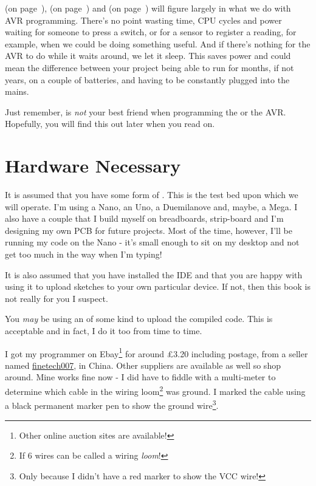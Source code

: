  (on page~\pageref{avr-interrupts}),  (on page~\pageref{avr-timers}) and  (on page~\pageref{avr-sleep-modes}) will figure largely in what we do with AVR programming. There's no point wasting time, CPU cycles and power waiting for someone to press a switch, or for a sensor to register a reading, for example, when we could be doing something useful. And if there's nothing for the AVR to do while it waits around, we let it sleep. This saves power and could mean the difference between your project being able to run for months, if not years, on a couple of batteries, and having to be constantly plugged into the mains.

Just remember,  is \emph{not} your best friend when programming the   or the AVR. Hopefully, you will find this out later when you read on.

\section*{Hardware Necessary}\label{hardware-necessary}

It is assumed that you have some form of . This is the test bed upon which we will operate. I'm using a Nano, an Uno, a Duemilanove and, maybe, a Mega. I also have a couple that I build myself on breadboards, strip-board and I'm designing my own PCB for future projects. Most of the time, however, I'll be running my code on the Nano - it's small enough to sit on my desktop and not get too much in the way when I'm typing!

It is also assumed that you have installed the  IDE and that you are happy with using it to upload sketches to your own particular device. If not, then this book is not really for you I suspect.

You \emph{may} be using an  of some kind to upload the compiled code. This is acceptable and in fact, I do it too from time to time.

I got my programmer on Ebay\footnote{Other online auction sites are available!} for around £3.20 including postage, from a seller named \href{http://stores.ebay.co.uk/finetech007}{finetech007}, in China. Other suppliers are available as well so shop around. Mine works fine now - I did have to fiddle with a multi-meter to determine which cable in the wiring loom\footnote{If 6 wires can be called a wiring \emph{loom}!} was ground. I marked the cable using a black permanent marker pen to show the ground wire\footnote{Only because I didn't have a red marker to show the VCC wire!}.


